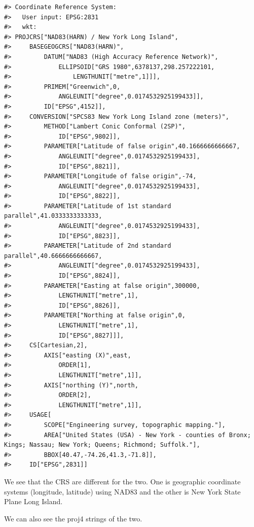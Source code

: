 \documentclass[
  11pt,
]{book}
\newenvironment{Shaded}{\begin{snugshade}}{\end{snugshade}}
\newcommand{\FunctionTok}[1]{\textcolor[rgb]{0.00,0.00,0.00}{#1}}
\newcommand{\NormalTok}[1]{#1}
\newcommand{\SpecialCharTok}[1]{\textcolor[rgb]{0.00,0.00,0.00}{#1}}
\begin{document}
\begin{verbatim}
#> Coordinate Reference System:
#>   User input: EPSG:2831 
#>   wkt:
#> PROJCRS["NAD83(HARN) / New York Long Island",
#>     BASEGEOGCRS["NAD83(HARN)",
#>         DATUM["NAD83 (High Accuracy Reference Network)",
#>             ELLIPSOID["GRS 1980",6378137,298.257222101,
#>                 LENGTHUNIT["metre",1]]],
#>         PRIMEM["Greenwich",0,
#>             ANGLEUNIT["degree",0.0174532925199433]],
#>         ID["EPSG",4152]],
#>     CONVERSION["SPCS83 New York Long Island zone (meters)",
#>         METHOD["Lambert Conic Conformal (2SP)",
#>             ID["EPSG",9802]],
#>         PARAMETER["Latitude of false origin",40.1666666666667,
#>             ANGLEUNIT["degree",0.0174532925199433],
#>             ID["EPSG",8821]],
#>         PARAMETER["Longitude of false origin",-74,
#>             ANGLEUNIT["degree",0.0174532925199433],
#>             ID["EPSG",8822]],
#>         PARAMETER["Latitude of 1st standard parallel",41.0333333333333,
#>             ANGLEUNIT["degree",0.0174532925199433],
#>             ID["EPSG",8823]],
#>         PARAMETER["Latitude of 2nd standard parallel",40.6666666666667,
#>             ANGLEUNIT["degree",0.0174532925199433],
#>             ID["EPSG",8824]],
#>         PARAMETER["Easting at false origin",300000,
#>             LENGTHUNIT["metre",1],
#>             ID["EPSG",8826]],
#>         PARAMETER["Northing at false origin",0,
#>             LENGTHUNIT["metre",1],
#>             ID["EPSG",8827]]],
#>     CS[Cartesian,2],
#>         AXIS["easting (X)",east,
#>             ORDER[1],
#>             LENGTHUNIT["metre",1]],
#>         AXIS["northing (Y)",north,
#>             ORDER[2],
#>             LENGTHUNIT["metre",1]],
#>     USAGE[
#>         SCOPE["Engineering survey, topographic mapping."],
#>         AREA["United States (USA) - New York - counties of Bronx; Kings; Nassau; New York; Queens; Richmond; Suffolk."],
#>         BBOX[40.47,-74.26,41.3,-71.8]],
#>     ID["EPSG",2831]]
\end{verbatim}

We see that the CRS are different for the two. One is geographic coordinate systems (longitude, latitude) using NAD83 and the other is New York State Plane Long Island.

We can also see the proj4 strings of the two.

\begin{Shaded}
\end{Shaded}
\end{document}
